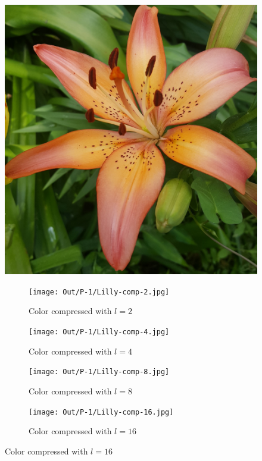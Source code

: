 \documentclass[dvipsnames]{article}
\begin{document}
\begin{figure}[H]
	\centering\includegraphics[width=.5\linewidth]{Images/P-1/Lilly.jpg}
	\caption{Original Lilly.jpg}

	\begin{subfigure}{.33\linewidth}
		\centering\texttt{[image: Out/P-1/Lilly-comp-2.jpg]}
		\caption{Color compressed with $l = 2$}
	\end{subfigure}
	\begin{subfigure}{.33\linewidth}
		\centering\texttt{[image: Out/P-1/Lilly-comp-4.jpg]}
		\caption{Color compressed with $l = 4$}
	\end{subfigure}
	\begin{subfigure}{.33\linewidth}
		\centering\texttt{[image: Out/P-1/Lilly-comp-8.jpg]}
		\caption{Color compressed with $l = 8$}
	\end{subfigure}
	\begin{subfigure}{.33\linewidth}
		\centering\texttt{[image: Out/P-1/Lilly-comp-16.jpg]}
		\caption{Color compressed with $l = 16$}
	\end{subfigure}
\end{figure}
\end{document}
